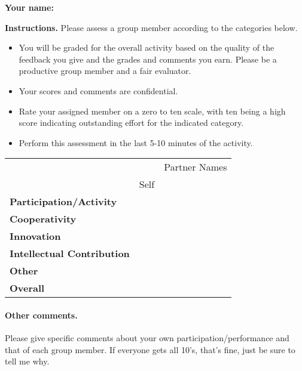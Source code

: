 \documentclass[12pt]{article}
\begin{document}
\pagestyle{fancy}%
\textbf{Your name:}\hspace{5cm}
\vspace{1cm}

\textbf{Instructions.}  Please assess a group member according to the categories below.  
\begin{itemize}
\item You will be graded for the overall activity based on the quality of the feedback you give and the grades and comments you earn.  Please be a productive group member and a fair evaluator.  
\item Your scores and comments are confidential.
\item Rate your assigned member on a zero to ten scale, with ten being a high score indicating outstanding effort for the indicated category.
\item Perform this assessment in the last 5-10 minutes of the activity.
\end{itemize}
\begin{center}
\begin{tabular}{|p{1.2in}||p{1in}|| p{1in} | p{1in} | p{1in} |}
\cline{1-5}
 &  & \multicolumn{3}{c|}{Partner Names}\\
\cline{3-5}
& \centering Self &  &  & \\
\cline{1-5}
\bf Participation/\newline Activity & & & &  \\[12pt]
\cline{1-5}
\bf Cooperativity &  & & & \\[12pt]
\cline{1-5}
\bf Innovation &  & & & \\[12pt]
\cline{1-5}
\bf Intellectual \newline Contribution  & & & & \\[12pt]
\hline
\bf Other  & & & & \\[12pt]
\hline
\hline
\bf Overall & & &  &  \\[12pt]
\cline{1-5}
\end{tabular}
\end{center}

\paragraph{Other comments.} Please give specific comments about your own participation/performance and that of each group member.  If everyone gets all 10's, that's fine, just be sure to tell me why.
\end{document}
